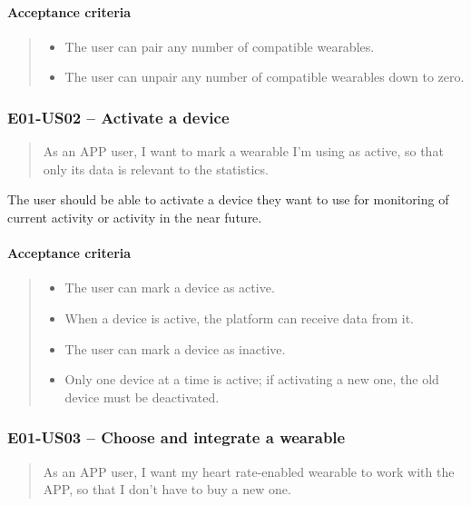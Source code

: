 \paragraph*{Acceptance criteria}
\begin{quote}
    \begin{itemize}
        \item The user can pair any number of compatible wearables.
        \item The user can unpair any number of compatible wearables down to zero.
    \end{itemize}
\end{quote}

\subsubsection*{E01-US02 -- Activate a device}

\begin{quote}
As an APP user, I want to mark a wearable I'm using as active, so that only its data is relevant to the statistics.
\end{quote}

The user should be able to activate a device they want to use for monitoring of current activity or activity in the near future.

\paragraph*{Acceptance criteria}
\begin{quote}
\begin{itemize}
    \item The user can mark a device as active.
    \item When a device is active, the platform can receive data from it.
    \item The user can mark a device as inactive.
    \item Only one device at a time is active; if activating a new one, the old device must be deactivated.
\end{itemize}    
\end{quote}

\subsubsection*{E01-US03 -- Choose and integrate a wearable}
\begin{quote}
As an APP user, I want my heart rate-enabled wearable to work with the APP, so that I don't have to buy a new one.
\end{quote}

